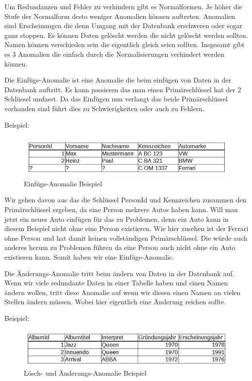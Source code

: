Um Redundanzen und Fehler zu verhindern gibt es Normalformen. Je höher die Stufe der Normalform desto weniger Anomalien können auftreten. Anomalien sind Erscheinungen die denn Umgang mit der Datenbank erschweren oder sogar ganz stoppen. Es können Daten gelöscht werden die nicht gelöscht werden sollten. Namen können verschieden sein die eigentlich gleich seien sollten.  Insgesamt gibt es 3 Anomalien die einfach durch die Normalisierungen verhindert werden können.

Die Einfüge-Anomalie ist eine Anomalie die beim einfügen von Daten in der Datenbank auftritt. Es kann passieren das man einen Primärschlüssel hat der 2 Schlüssel umfasst. Da das Einfügen nun verlangt das beide Primärschlüssel vorhanden sind führt dies zu Schwierigkeiten oder auch zu Fehlern.

Beispiel:
\begin{figure}[!htb]
	\centering
	\includegraphics[width=13cm,keepaspectratio]{bilder/KFZBeispiel}
	\caption{Einfüge-Anomalie Beispiel}
	\label{fig:kfzbeispiel}
\end{figure}

Wir gehen davon aus das die Schlüssel PersonId und Kennzeichen zusammen den Primärschlüssel ergeben, da eine Person mehrere Autos haben kann. Will man jetzt ein neues Auto einfügen für das zu Problemen, denn ein Auto kann in diesem Beispiel nicht ohne eine Person existieren. Wie hier zusehen ist der Ferrari ohne Person und hat damit keinen vollständigen Primärschlüssel. Die würde auch anderes herum zu Problemen führen da eine Person auch nicht ohne ein Auto existieren kann. Somit haben wir eine Einfüge-Anomalie. 

Die Änderungs-Anomalie tritt beim ändern von Daten in der Datenbank auf. Wenn wir viele redundante Daten in einer Tabelle haben und einen Namen ändern wollen, tritt diese Anomalie auf wenn wir diesen einen Namen an vielen Stellen ändern müssen. Wobei hier eigentlich eine Änderung reichen sollte.

Beispiel:
\begin{figure}[!htb]
	\centering
	\includegraphics[width=13cm,keepaspectratio]{bilder/AlbumBeispiel}
	\caption{Lösch- und Änderungs-Anomalie Beispiel}
	\label{fig:albumbeispiel}
\end{figure}

